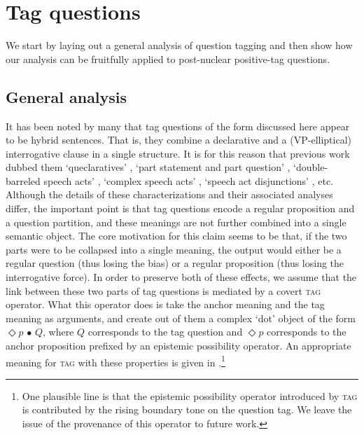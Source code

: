 \documentclass[output=paper,colorlinks,citecolor=brown]{langscibook}
\begin{document}
\section{Tag questions}\label{Sect2}

We start by laying out a general analysis of question tagging and then show how our analysis can be fruitfully applied to post-nuclear positive-tag questions.

\subsection{General analysis}

It has been noted by many that tag questions of the form discussed here appear to be hybrid sentences. That is, they combine a declarative and a (VP-elliptical) interrogative clause in a single structure. It is for this reason that previous work dubbed them `queclaratives' \citep{sadock1971}, `part statement and part question' \citep{Rando1980}, `double-barreled speech acts' \citep{Ladd1981a}, `complex speech acts' \citep{Reese2007}, `speech act disjunctions' \citep{krifka2015}, etc. Although the details of these characterizations and their associated analyses differ, the important point is that tag questions encode a regular proposition and a question partition, and these meanings are not further combined into a single semantic object. The core motivation for this claim seems to be that, if the two parts were to be collapsed into a single meaning, the output would either be a regular question (thus losing the bias) or a regular proposition (thus losing the interrogative force). In order to preserve both of these effects, we assume that the link between these two parts of tag questions is mediated by a covert \textsc{tag} operator. What this operator does is take the anchor meaning and the tag meaning as arguments, and create out of them a complex `dot' object of the form $\Diamond p \, \bullet \, Q$, where $Q$ corresponds to the tag question and $\Diamond p$ corresponds to the anchor proposition prefixed by an epistemic possibility operator. An appropriate meaning for \textsc{tag} with these properties is given in .\footnote{One plausible line is that the epistemic possibility operator introduced by \textsc{tag} is contributed by the rising boundary tone on the question tag. We leave the issue of the provenance of this operator to future work.}
\end{document}
